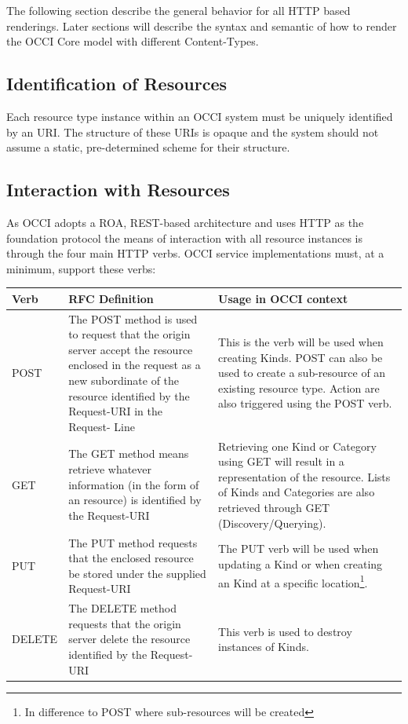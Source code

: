\documentclass[10pt,a4paper]{article}
\begin{document}
The following section describe the general behavior for all HTTP based renderings. Later sections will describe the syntax and semantic of how to render the OCCI Core model with different Content-Types.

\subsection{Identification of Resources}
Each resource type instance within an OCCI system must be uniquely identified by an URI. The structure of these URIs is opaque and the system should not assume a static, pre-determined scheme for their structure.

\subsection{Interaction with Resources}
As OCCI adopts a ROA, REST-based architecture and uses HTTP as the foundation protocol the means of interaction with all resource instances is through the four main HTTP verbs. OCCI service implementations must, at a minimum, support these verbs:

\begin{tabular}{l|p{3.2in}|p{2in}}
Verb & RFC Definition & Usage in OCCI context \\
\hline
POST & The POST method is used to request that the origin server accept the resource enclosed in the request as a new subordinate of the resource identified by the Request-URI in the Request- Line & This is the verb will be used when creating Kinds. POST can also be used to create a sub-resource of an existing resource type. Action are also triggered using the POST verb. \\
GET & The GET method means retrieve whatever information (in the form of an resource) is identified by the Request-URI & Retrieving one Kind or Category using GET will result in a representation of the resource. Lists of Kinds and Categories are also retrieved through GET (Discovery/Querying). \\
PUT & The PUT method requests that the enclosed resource be stored under the supplied Request-URI & The PUT verb will be used when updating a Kind or when creating an Kind at a specific location\footnote{In difference to POST where sub-resources will be created}. \\
DELETE & The DELETE method requests that the origin server delete the resource identified by the Request-URI & This verb is used to destroy instances of Kinds. \\ 
\end{tabular}
\end{document}
